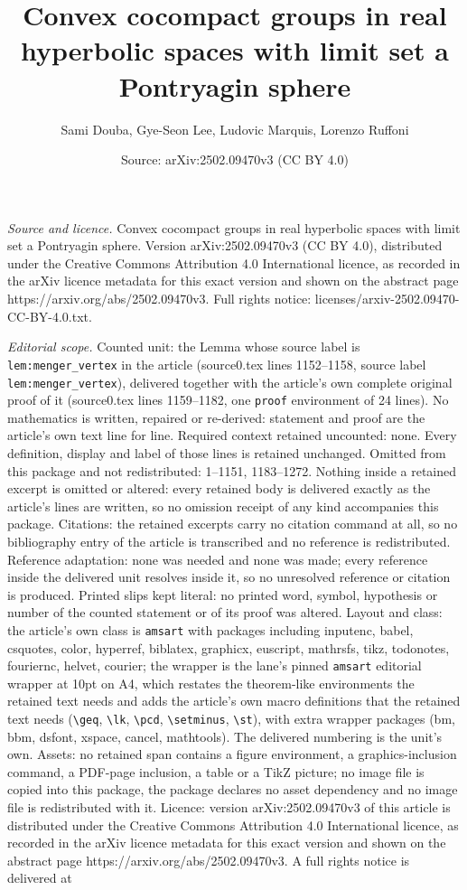 \documentclass[10pt,a4paper]{amsart}
\title[Convex cocompact groups in real hyperbolic spaces with limit]{Convex cocompact groups in real hyperbolic spaces with limit set a Pontryagin sphere}
\author{Sami Douba, Gye-Seon Lee, Ludovic Marquis, Lorenzo Ruffoni}
\date{Source: arXiv:2502.09470v3 (CC BY 4.0)}
\begin{document}
\maketitle

\noindent\emph{Source and licence.} Convex cocompact groups in real hyperbolic spaces with limit set a Pontryagin sphere. Version arXiv:2502.09470v3 (CC BY 4.0), distributed under the Creative Commons Attribution 4.0 International licence, as recorded in the arXiv licence metadata for this exact version and shown on the abstract page https://arxiv.org/abs/2502.09470v3. Full rights notice: licenses/arxiv-2502.09470-CC-BY-4.0.txt.\par\smallskip

\noindent\textit{Editorial scope.} Counted unit: the Lemma whose source label is \texttt{lem:menger\_vertex} in the article (source0.tex lines 1152--1158, source label \texttt{lem:menger\_vertex}), delivered together with the article's own complete original proof of it (source0.tex lines 1159--1182, one \texttt{proof} environment of 24 lines). No mathematics is written, repaired or re-derived: statement and proof are the article's own text line for line. Required context retained uncounted: none. Every definition, display and label of those lines is retained unchanged. Omitted from this package and not redistributed: 1--1151, 1183--1272. Nothing inside a retained excerpt is omitted or altered: every retained body is delivered exactly as the article's lines are written, so no omission receipt of any kind accompanies this package. Citations: the retained excerpts carry no citation command at all, so no bibliography entry of the article is transcribed and no reference is redistributed. Reference adaptation: none was needed and none was made; every reference inside the delivered unit resolves inside it, so no unresolved reference or citation is produced. Printed slips kept literal: no printed word, symbol, hypothesis or number of the counted statement or of its proof was altered. Layout and class: the article's own class is \texttt{amsart} with packages including inputenc, babel, csquotes, color, hyperref, biblatex, graphicx, euscript, mathrsfs, tikz, todonotes, fouriernc, helvet, courier; the wrapper is the lane's pinned \texttt{amsart} editorial wrapper at 10pt on A4, which restates the theorem-like environments the retained text needs and adds the article's own macro definitions that the retained text needs (\texttt{\textbackslash geq}, \texttt{\textbackslash lk}, \texttt{\textbackslash pcd}, \texttt{\textbackslash setminus}, \texttt{\textbackslash st}), with extra wrapper packages (bm, bbm, dsfont, xspace, cancel, mathtools). The delivered numbering is the unit's own. Assets: no retained span contains a figure environment, a graphics-inclusion command, a PDF-page inclusion, a table or a TikZ picture; no image file is copied into this package, the package declares no asset dependency and no image file is redistributed with it. Licence: version arXiv:2502.09470v3 of this article is distributed under the Creative Commons Attribution 4.0 International licence, as recorded in the arXiv licence metadata for this exact version and shown on the abstract page https://arxiv.org/abs/2502.09470v3. A full rights notice is delivered at 
\end{document}
